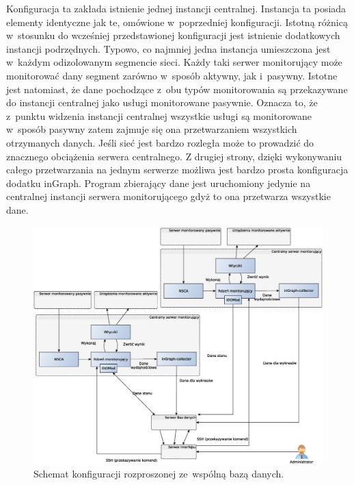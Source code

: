 Konfiguracja ta zakłada istnienie jednej instancji
centralnej. Instancja ta posiada elementy identyczne jak te, omówione
w~poprzedniej konfiguracji. Istotną różnicą w~stosunku do wcześniej
przedstawionej konfiguracji jest istnienie dodatkowych instancji
podrzędnych. Typowo, co najmniej jedna instancja umieszczona jest
w~każdym odizolowanym segmencie sieci. Każdy taki serwer monitorujący
może monitorować dany segment zarówno w~sposób aktywny, jak
i~pasywny. Istotne jest natomiast, że dane pochodzące z~obu typów
monitorowania są przekazywane do instancji centralnej jako usługi
monitorowane pasywnie. Oznacza to, że z~punktu widzenia instancji
centralnej wszystkie usługi są monitorowane w~sposób pasywny zatem
zajmuje się ona przetwarzaniem wszystkich otrzymanych danych. Jeśli
sieć jest bardzo rozległa może to prowadzić do znacznego obciążenia
serwera centralnego. Z drugiej strony, dzięki wykonywaniu całego przetwarzania na jednym
serwerze możliwa jest bardzo prosta konfiguracja dodatku
inGraph. Program zbierający dane jest uruchomiony jedynie na
centralnej instancji serwera monitorującego gdyż to ona przetwarza
wszystkie dane.

\begin{figure}[htpb]
\centering
  \caption{Schemat konfiguracji rozproszonej ze~wspólną bazą danych.}
  \label{fig:rozpFull}
\includegraphics[width=1\textwidth]{img/icingaFull}
\end{figure}

